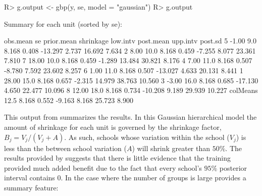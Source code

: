 \documentclass[article]{jss}
\begin{document}
\begin{CodeChunk}
\begin{CodeInput}
R> g.output <- gbp(y, se, model = "gaussian")
R> g.output
\end{CodeInput}
\begin{CodeOutput}
Summary for each unit (sorted by se):

         obs.mean   se prior.mean shrinkage low.intv post.mean upp.intv post.sd
5           -1.00  9.0      8.168     0.408  -13.297     2.737   16.692   7.634
2            8.00 10.0      8.168     0.459   -7.255     8.077   23.361   7.810
7           18.00 10.0      8.168     0.459   -1.289    13.484   30.821   8.176
4            7.00 11.0      8.168     0.507   -8.780     7.592   23.602   8.257
6            1.00 11.0      8.168     0.507  -13.027     4.633   20.131   8.441
1           28.00 15.0      8.168     0.657   -2.315    14.979   38.763  10.560
3           -3.00 16.0      8.168     0.685  -17.130     4.650   22.477  10.096
8           12.00 18.0      8.168     0.734  -10.208     9.189   29.939  10.227
colMeans          12.5      8.168     0.552   -9.163     8.168   25.723   8.900
\end{CodeOutput}
\end{CodeChunk}
This output from  summarizes the results. In this Gaussian hierarchical model the amount of shrinkage for each unit is governed by the shrinkage factor, $B_j = V_j/(V_j + A)$. As such, schools whose variation within the school ($V_{j}$) is less than the between school variation ($A$) will shrink greater than $50\%$. The results provided by  suggests that there is little evidence that the training provided much added benefit due to the fact that every school's $95\%$ posterior interval contains 0. In the case where the number of groups is large  provides a summary feature:
\end{document}
